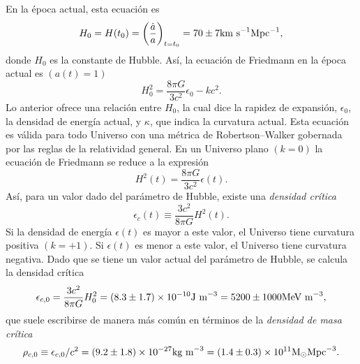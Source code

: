 \documentclass[a4paper,openright,12pt]{book}
\begin{document}
En la época actual, esta ecuación es 
\begin{equation}
H_{0} = H(t_{0}) = \left(\frac{\dot{a}}{a}\right) 
_{t=t_{0}} = 70 \pm 7 \textup{km s}^{-1} \textup{Mpc}^{-1},\label{eqn 1.20}
\end{equation}
donde $H_{0}$ es la constante de Hubble. Así, la ecuación de Friedmann en la época actual es $(a(t) = 1)$ 
\begin{equation}
H_{0}^{2} = \frac{8 \pi G}{3 c^{2}}\epsilon_{0} 
-k c^{2}. \label{eqn 1.21}
\end{equation}
Lo anterior ofrece una relación entre $H_{0}$, la cual dice la rapidez de expansión, $\epsilon_{0}$, la densidad de energía actual, y $\kappa$, que indica la curvatura actual. Esta ecuación es válida para todo Universo con una métrica de Robertson--Walker gobernada por las reglas de la relatividad general. En un Universo plano $(k = 0)$ la ecuación de Friedmann se reduce a la expresión
\begin{equation}
H^{2}(t)=\frac{8 \pi G}{3 c^{2}}\epsilon(t).\label{eqn 1.22}
\end{equation}
Así, para un valor dado del parámetro de Hubble, existe una \textit{densidad crítica}
\begin{equation}
\epsilon_{c}(t) \equiv \frac{3 c^{2}}{8 \pi G} H^{2}(t).\label{eqn 1.23}
\end{equation}
Si la densidad de energía $\epsilon(t)$ es mayor a este valor, el Universo tiene curvatura positiva $(k = +1)$. Si $\epsilon(t)$ es menor a este valor, el Universo tiene curvatura negativa. Dado que se tiene un valor actual del parámetro de Hubble, se calcula la densidad crítica
\begin{equation}
\epsilon_{c,0} = \frac{3 c^{2}}{8 \pi G}H_{0}^{2}
=
(8.3 \pm 1.7) \times 10^{-10} \textup{J m} ^{-3}
=
5200 \pm 1000 \textup{MeV m} ^{-3},\label{eqn 1.24}
\end{equation}
que suele escribirse de manera más común en términos de la \textit{densidad de masa crítica}
\begin{equation}
\rho_{c,0} \equiv \epsilon_{c,0}/c^{2}
=
(9.2 \pm 1.8) \times 10^{-27} \textup{kg m}^{-3}
=
(1.4 \pm 0.3) \times 10^{11} \textup{M}_{\odot} \textup{Mpc}^{-3}.\label{eqn 1.25}
\end{equation}
\end{document}
